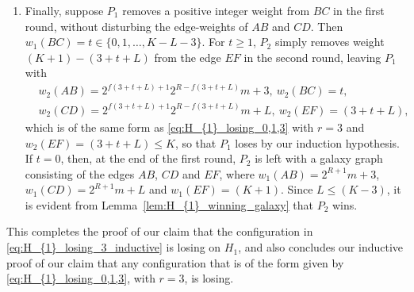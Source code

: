 \documentclass[11pt,reqno]{amsart}
\theoremstyle{definition}
\theoremstyle{definition}
\begin{document}
\begin{enumerate}
\item Finally, suppose $P_{1}$ removes a positive integer weight from $BC$ in the first round, without disturbing the edge-weights of $AB$ and $CD$. Then $w_{1}(BC)=t \in \{0,1,\ldots,K-L-3\}$. For $t\geqslant 1$, $P_{2}$ simply removes weight $(K+1)-(3+t+L)$ from the edge $EF$ in the second round, leaving $P_{1}$ with
\begin{align}
{}&w_{2}(AB)=2^{f(3+t+L)+1}2^{R-f(3+t+L)}m+3,\ w_{2}(BC)=t,\nonumber\\
{}&w_{2}(CD)=2^{f(3+t+L)+1}2^{R-f(3+t+L)}m+L,\ w_{2}(EF)=(3+t+L),\nonumber
\end{align}
which is of the same form as \eqref{eq:H_{1}_losing_0,1,3} with $r=3$ and $w_{2}(EF)=(3+t+L)\leqslant K$, so that $P_{1}$ loses by our induction hypothesis. If $t=0$, then, at the end of the first round, $P_{2}$ is left with a galaxy graph consisting of the edges $AB$, $CD$ and $EF$, where $w_{1}(AB)=2^{R+1}m+3$, $w_{1}(CD)=2^{R+1}m+L$ and $w_{1}(EF)=(K+1)$. Since $L\leqslant (K-3)$, it is evident from Lemma~\ref{lem:H_{1}_winning_galaxy} that $P_{2}$ wins.
\end{enumerate}
This completes the proof of our claim that the configuration in \eqref{eq:H_{1}_losing_3_inductive} is losing on $H_{1}$, and also concludes our inductive proof of our claim that any configuration that is of the form given by \eqref{eq:H_{1}_losing_0,1,3}, with $r=3$, is losing.
\end{document}
